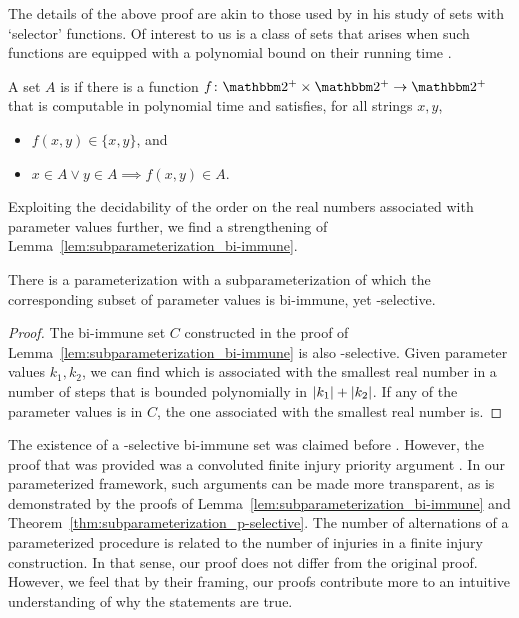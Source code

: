 The details of the above proof are akin to those used by \textcite{jockusch1968semirecursive} in his study of sets with `selector' functions.
Of interest to us is a class of sets that arises when such functions are equipped with a polynomial bound on their running time  \parencite{selman1979p-selective}.
\begin{definition}
  A set $A$ is  if there is a function $f\colon \binary^+ \times \binary^+ \to \binary^+$ that is computable in polynomial time and satisfies, for all strings $x, y$,
  \begin{itemize}
  \item $f(x, y) \in \{x, y\}$, and
  \item $x \in A \lor y \in A \implies f(x, y) \in A$.
  \end{itemize}
\end{definition}

Exploiting the decidability of the order on the real numbers associated with parameter values further, we find a strengthening of Lemma~\ref{lem:subparameterization_bi-immune}.
\begin{theorem}
\label{thm:subparameterization_p-selective}
  There is a parameterization with a subparameterization of which the corresponding subset of parameter values is bi-immune, yet \slp-selective.
\end{theorem}
\begin{proof}
  The bi-immune set $C$ constructed in the proof of Lemma~\ref{lem:subparameterization_bi-immune} is also \slp-selective.
  Given parameter values $k_1, k_2$, we can find which is associated with the smallest real number in a number of steps that is bounded polynomially in ${\lvert k_1\rvert} + {\lvert k_2\rvert}$.
  If any of the parameter values is in $C$, the one associated with the smallest real number is.
\end{proof}

The existence of a \slp-selective bi-immune set was claimed before \parencite{goldsmith1993note}.
However, the proof that was provided was a convoluted finite injury priority argument \parencite[see also][]{downey2010algorithmic}.
In our parameterized framework, such arguments can be made more transparent, as is demonstrated by the proofs of Lemma~\ref{lem:subparameterization_bi-immune} and Theorem~\ref{thm:subparameterization_p-selective}.
The number of alternations of a parameterized procedure is related to the number of injuries in a finite injury construction.
In that sense, our proof does not differ from the original proof.
However, we feel that by their framing, our proofs contribute more to an intuitive understanding of why the statements are true.
